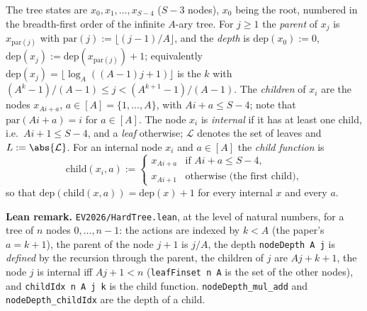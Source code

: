 \begin{definition}\label{def:hard_tree}
\leanok
The tree states are $x_0, x_1, \dots, x_{S-4}$ ($S - 3$ nodes), $x_0$ being the root, numbered in
the breadth-first order of the infinite $A$-ary tree. For $j \ge 1$ the \emph{parent} of $x_j$ is
$x_{\mathrm{par}(j)}$ with $\mathrm{par}(j) := \lfloor (j - 1)/A \rfloor$, and the \emph{depth} is
$\mathrm{dep}(x_0) := 0$, $\mathrm{dep}(x_j) := \mathrm{dep}(x_{\mathrm{par}(j)}) + 1$; equivalently
$\mathrm{dep}(x_j) = \lfloor \log_A((A-1)j + 1)\rfloor$ is the $k$ with
$(A^k - 1)/(A-1) \le j < (A^{k+1} - 1)/(A-1)$. The \emph{children} of $x_i$ are the nodes
$x_{Ai + a}$, $a \in [A] = \{1, \dots, A\}$, with $Ai + a \le S - 4$; note that
$\mathrm{par}(Ai + a) = i$ for $a \in [A]$. The node $x_i$ is \emph{internal} if it has at least
one child, i.e.\ $Ai + 1 \le S - 4$, and a \emph{leaf} otherwise; $\mathcal L$ denotes the set of
leaves and $L := \abs{\mathcal L}$. For an internal node $x_i$ and $a \in [A]$ the \emph{child
function} is
\[
  \mathrm{child}(x_i, a) := \begin{cases} x_{Ai + a} & \text{if } Ai + a \le S - 4, \\ x_{Ai + 1} & \text{otherwise (the first child),}\end{cases}
\]
so that $\mathrm{dep}(\mathrm{child}(x, a)) = \mathrm{dep}(x) + 1$ for every internal $x$ and every $a$.
\end{definition}

\textbf{Lean remark.} \texttt{EV2026/HardTree.lean}, at the level of natural numbers, for a tree of
$n$ nodes $0, \dots, n - 1$: the actions are indexed by $k < A$ (the paper's $a = k + 1$), the parent of
the node $j + 1$ is $j / A$, the depth \texttt{nodeDepth A j} is \emph{defined} by the recursion through the
parent, the children of $j$ are $Aj + k + 1$, the node $j$ is internal iff $Aj + 1 < n$
(\texttt{leafFinset n A} is the set of the other nodes), and \texttt{childIdx n A j k} is the child
function. \texttt{nodeDepth\_mul\_add} and \texttt{nodeDepth\_childIdx} are the depth of a child.

